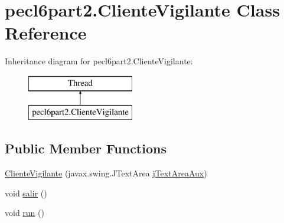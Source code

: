 \hypertarget{classpecl6part2_1_1_cliente_vigilante}{}\section{pecl6part2.\+Cliente\+Vigilante Class Reference}
\label{classpecl6part2_1_1_cliente_vigilante}
Inheritance diagram for pecl6part2.\+Cliente\+Vigilante\+:\begin{figure}[H]
\begin{center}
\leavevmode
\includegraphics[height=2.000000cm]{classpecl6part2_1_1_cliente_vigilante}
\end{center}
\end{figure}
\subsection*{Public Member Functions}
\begin{DoxyCompactItemize}
\item 
\mbox{\hyperlink{classpecl6part2_1_1_cliente_vigilante_a2ba9f0dd667c95448bbbf3fe0cfccfcf}{Cliente\+Vigilante}} (javax.\+swing.\+J\+Text\+Area \mbox{\hyperlink{classpecl6part2_1_1_cliente_vigilante_a1a8bbb57af057f85a3d16d5371bd747f}{j\+Text\+Area\+Aux}})
\item 
void \mbox{\hyperlink{classpecl6part2_1_1_cliente_vigilante_a79eb08097bb28efa5c33a168babe47e8}{salir}} ()
\item 
void \mbox{\hyperlink{classpecl6part2_1_1_cliente_vigilante_a38c9e8737a78b3a8cd85f85c0adfc08e}{run}} ()
\end{DoxyCompactItemize}
